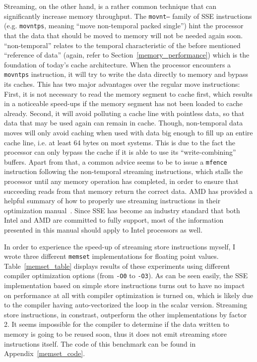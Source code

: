 Streaming, on the other hand, is a rather common technique that can significantly increase memory throughput. The \texttt{movnt--} family of SSE instructions (e.g. \texttt{movntps}, meaning ``move non-temporal packed single'') hint the processor that the data that should be moved to memory will not be needed again soon. ``non-temporal'' relates to the temporal characteristic of the before mentioned ``reference of data'' (again, refer to Section~\ref{memory_performance}) which is the foundation of today's cache architecture. When the processor encounters a \texttt{movntps} instruction, it will try to write the data directly to memory and bypass its caches. This has two major advantages over the regular move instructions: First, it is not necessary to read the memory segment to cache first, which results in a noticeable speed-ups if the memory segment has not been loaded to cache already. Second, it will avoid polluting a cache line with pointless data, so that data that may be used again can remain in cache. Though, non-temporal data moves will only avoid caching when used with data big enough to fill up an entire cache line, i.e. at least 64 bytes on most systems. This is due to the fact the processor can only bypass the cache if it is able to use its ``write-combining'' buffers. Apart from that, a common advice seems to be to issue a \texttt{mfence} instruction following the non-temporal streaming instructions, which stalls the processor until any memory operation has completed, in order to ensure that succeeding reads from that memory return the correct data. AMD has provided a helpful summary of how to properly use streaming instructions in their optimization manual~\cite[pp. 106ff, 231ff]{amd2012optimization}. Since SSE has become an industry standard that both Intel and AMD are committed to fully support, most of the information presented in this manual should apply to Intel processors as well.

In order to experience the speed-up of streaming store instructions myself, I wrote three different \texttt{memset} implementations for floating point values. Table~\ref{memset_table} displays results of these experiments using different compiler optimization options (from \texttt{-O0} to \texttt{-O3}). As can be seen easily, the SSE implementation based on simple store instructions turns out to have no impact on performance at all with compiler optimization is turned on, which is likely due to the compiler having auto-vectorized the loop in the scalar version. Streaming store instructions, in constrast, outperform the other implementations by factor 2. It seems impossible for the compiler to determine if the data written to memory is going to be reused soon, thus it does not emit streaming store instructions itself. The code of this benchmark can be found in Appendix~\ref{memset_code}.

